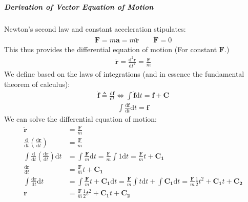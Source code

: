 \documentclass[letterpaper,11pt,english]{sphinxmanual}
\begin{document}
\subparagraph{Derivation of Vector Equation of Motion}
\label{\detokenize{technical/algorithms/spherical_kinematics:derivation-of-vector-equation-of-motion}}
\sphinxAtStartPar
Newton’s second law and constant acceleration stipulates:
\begin{equation*}
\begin{split}\mathbf{F} = m \mathbf{a} = m \ddot{\mathbf{r}} \qquad \dot{\mathbf{F}} = 0\end{split}
\end{equation*}
\sphinxAtStartPar
This thus provides the differential equation of motion (For constant \(\mathbf{F}\).)
\begin{equation*}
\begin{split}\ddot{\mathbf{r}} = \frac{\mathrm{d}^2\mathbf{r}}{\mathrm{d}t^2} = \frac{\mathbf{F}}{m}\end{split}
\end{equation*}
\sphinxAtStartPar
We define based on the laws of integrations (and in essence the fundamental
theorem of calculus):
\begin{equation*}
\begin{split}\dot{\mathbf{f}} \triangleq \frac{\mathrm{d}\mathbf{f}}{\mathrm{d}t} \Longleftrightarrow \int \dot{\mathbf{f}} \mathrm{d} t = \mathbf{f} + \mathbf{C}\end{split}
\end{equation*}\begin{equation*}
\begin{split}\int \frac{\mathrm{d}\mathbf{f}}{\mathrm{d}t} \mathrm{d} t = \mathbf{f}\end{split}
\end{equation*}
\sphinxAtStartPar
We can solve the differential equation of motion:
\begin{equation*}
\begin{split}\ddot{\mathbf{r}} &= \frac{\mathbf{F}}{m} \\
\frac{\mathrm{d}}{\mathrm{d}t} \left( \frac{\mathrm{d}\mathbf{r}}{\mathrm{d}t} \right) &= \frac{\mathbf{F}}{m} \\
\int \frac{\mathrm{d}}{\mathrm{d}t} \left( \frac{\mathrm{d}\mathbf{r}}{\mathrm{d}t} \right) \mathrm{d}t &= \int \frac{\mathbf{F}}{m} \mathrm{d}t = \frac{\mathbf{F}}{m} \int 1 \mathrm{d}t = \frac{\mathbf{F}}{m} t + \mathbf{C_1} \\
\frac{\mathrm{d}\mathbf{r}}{\mathrm{d}t} &= \frac{\mathbf{F}}{m} t + \mathbf{C_1} \\
\int \frac{\mathrm{d}\mathbf{r}}{\mathrm{d}t} \mathrm{d}t &= \int \frac{\mathbf{F}}{m} t + \mathbf{C_1} \mathrm{d}t = \frac{\mathbf{F}}{m} \int t \mathrm{d}t + \int \mathbf{C_1} \mathrm{d}t = \frac{\mathbf{F}}{m} \frac{1}{2} t^2 + \mathbf{C_1} t + \mathbf{C_2} \\
\mathbf{r} &= \frac{\mathbf{F}}{m} \frac{1}{2} t^2 + \mathbf{C_1} t + \mathbf{C_2}\end{split}
\end{equation*}
\end{document}
